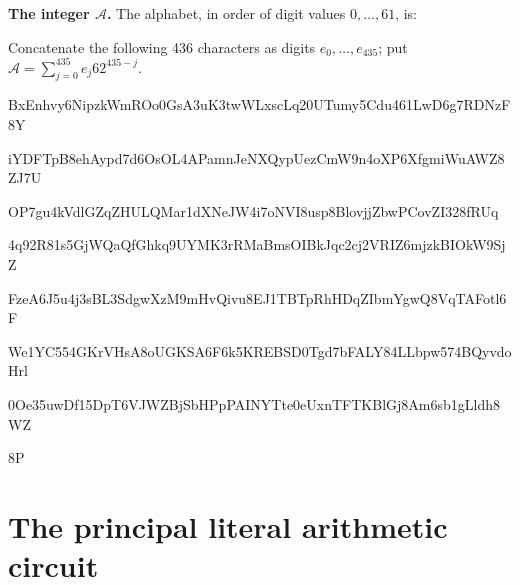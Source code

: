 \documentclass[11pt]{article}
\theoremstyle{remark}\newtheorem{remark}[theorem]{Remark}
\begin{document}
\textbf{The integer $\mathcal A$.}
The alphabet, in order of digit values $0,\ldots,61$, is:\par
{}\par
Concatenate the following 436 characters as digits $e_0,\ldots,e_{435}$;
put $\mathcal A=\sum_{j=0}^{435}e_j62^{435-j}$.\par
\begingroup\fontsize{7.7}{8.2}\selectfont\ttfamily
BxEnhvy6NipzkWmROo0GsA3uK3twWLxscLq20UTumy5Cdu461LwD6g7RDNzF8Y\par
iYDFTpB8ehAypd7d6OsOL4APamnJeNXQypUezCmW9n4oXP6XfgmiWuAWZ8ZJ7U\par
OP7gu4kVdlGZqZHULQMar1dXNeJW4i7oNVI8usp8BlovjjZbwPCovZI328fRUq\par
4q92R81s5GjWQaQfGhkq9UYMK3rRMaBmsOIBkJqc2cj2VRIZ6mjzkBIOkW9SjZ\par
FzeA6J5u4j3sBL3SdgwXzM9mHvQivu8EJ1TBTpRhHDqZIbmYgwQ8VqTAFotl6F\par
We1YC554GKrVHsA8oUGKSA6F6k5KREBSD0Tgd7bFALY84LLbpw574BQyvdoHrl\par
0Oe35uwDf15DpT6VJWZBjSbHPpPAINYTte0eUxnTFTKBlGj8Am6sb1gLldh8WZ\par
8P\par
\endgroup

\endgroup



\section{The principal literal arithmetic circuit}\label{app:circuit}
\end{document}
